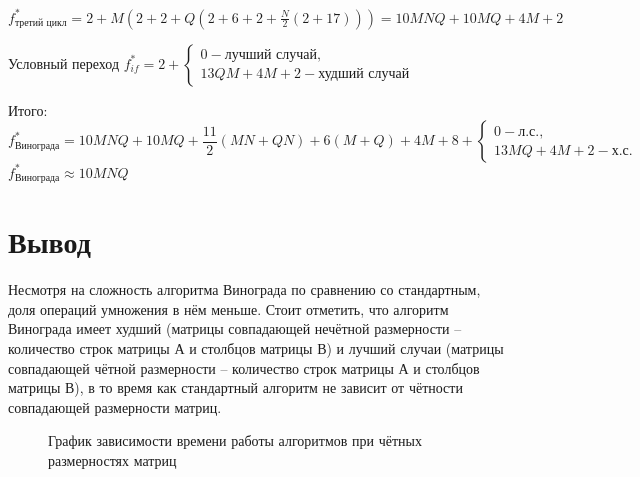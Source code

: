             $ f_\text{третий цикл}^* = 2 + M(2 + 2 + Q(2 + 6 + 2 + \frac{N}{2}(2 + 17))) = 10MNQ + 10MQ + 4M + 2$

            Условный переход $f_{if}^* = 2 + \left\{
                \begin{matrix}
                0 - \text{лучший случай},\\
                13QM + 4M + 2 - \text{худший случай} 
                \end{matrix}\right.$

            Итого:
            \begin{equation}
                f_\text{Винограда}^* = 10MNQ + 10MQ + \frac{11}{2}(MN + QN) + 6(M + Q) + 4M + 8 + 
                    \left\{ \begin{matrix}
                    0 - \text{л.с.},\\
                    13MQ + 4M + 2 - \text{х.с.} 
                    \end{matrix}\right.
            \end{equation}
            $ f_\text{Винограда}^* \approx 10MNQ $

    \section{Вывод}
        Несмотря на сложность алгоритма Винограда по сравнению со стандартным, доля операций умножения в нём меньше.
        Стоит отметить, что алгоритм Винограда имеет худший (матрицы совпадающей нечётной размерности -- количество строк матрицы А и столбцов матрицы В) и лучший случаи (матрицы совпадающей чётной размерности -- количество строк матрицы А и столбцов матрицы В),
        в то время как стандартный алгоритм не зависит от чётности совпадающей размерности матриц.


    \begin{figure}[h!]
        \centering
        \caption{График зависимости времени работы алгоритмов при чётных размерностях матриц} 
        \label{graph:test:1}
    \end{figure}

